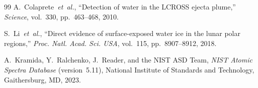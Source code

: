 \documentclass[a4paper,twocolumn,10pt]{article}
\begin{document}
\begin{thebibliography}{99}
A.~Colaprete~\emph{et~al.},
``Detection of water in the LCROSS ejecta plume,''
\textit{Science}, vol.~330, pp.~463--468, 2010.

S.~Li~\emph{et~al.},
``Direct evidence of surface-exposed water ice in the lunar polar
regions,''
\textit{Proc. Natl. Acad. Sci. USA}, vol.~115, pp.~8907--8912, 2018.

A.~Kramida, Y.~Ralchenko, J.~Reader, and the NIST ASD Team,
\textit{NIST Atomic Spectra Database} (version~5.11),
National Institute of Standards and Technology, Gaithersburg, MD,
2023.

\end{thebibliography}
\end{document}
